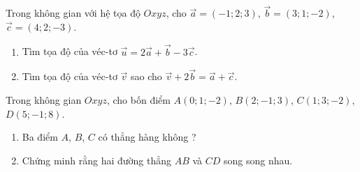 \begin{bt}%
	Trong không gian với hệ tọa độ $Oxyz$, cho $\vec{a}=(-1;2;3)$, $\vec{b}=(3;1;-2)$, $\vec{c}=(4;2;-3)$.
	\begin{enumerate}
		\item Tìm tọa độ của véc-tơ $\vec{u}=2\vec{a}+\vec{b}-3\vec{c}$.
		\item Tìm tọa độ của véc-tơ $\vec{v}$ sao cho $\vec{v}+2\vec{b}=\vec{a}+\vec{c}$.
	\end{enumerate}
\end{bt}

\begin{bt}%
	Trong không gian $Oxyz$, cho bốn điểm $A(0;1;-2)$, $B(2;-1;3)$, $C(1;3;-2)$, $D(5;-1;8)$.
	\begin{enumerate}
		\item Ba điểm $A$, $B$, $C$ có thẳng hàng không ?
		\item Chứng minh rằng hai đường thẳng $AB$ và $CD$ song song nhau.
	\end{enumerate}
\end{bt}

